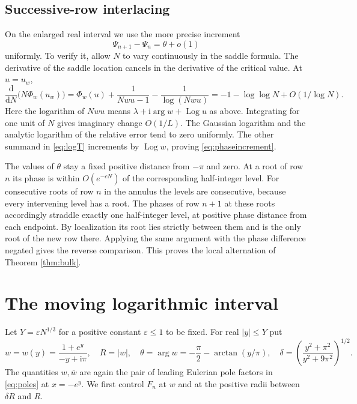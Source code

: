 \documentclass[11pt]{article}
\DeclareMathOperator{\Arg}{arg}
\newcommand{\dd}{\mathrm d}
\newcommand{\ii}{\mathrm i}
\newcommand{\Log}{\operatorname{Log}}
\begin{document}
\subsection{Successive-row interlacing}

On the enlarged real interval we use the more precise increment
\begin{equation}\label{eq:phaseincrement}
 \Psi_{n+1}-\Psi_n=\theta+o(1)
\end{equation}
uniformly. To verify it, allow \(N\) to vary continuously in the saddle formula. The derivative of the saddle location cancels in the derivative of the critical value. At \(u=u_w\),
\[
 \frac{\dd}{\dd N}\bigl(N\Phi_w(u_w)\bigr)
 =\Phi_w(u)+\frac{1}{Nwu-1}-\frac{1}{\log(Nwu)}
 =-1-\log\log N+O(1/\log N).
\]
Here the logarithm of \(Nwu\) means \(\lambda+\ii\Arg w+\Log u\) as above. Integrating for one unit of \(N\) gives imaginary change \(O(1/L)\). The Gaussian logarithm and the analytic logarithm of the relative error tend to zero uniformly. The other summand in \eqref{eq:logT} increments by \(\Log w\), proving \eqref{eq:phaseincrement}.

The values of \(\theta\) stay a fixed positive distance from \(-\pi\) and zero. At a root of row \(n\) its phase is within \(O(e^{-cN})\) of the corresponding half-integer level. For consecutive roots of row \(n\) in the annulus the levels are consecutive, because every intervening level has a root. The phases of row \(n+1\) at these roots accordingly straddle exactly one half-integer level, at positive phase distance from each endpoint. By localization its root lies strictly between them and is the only root of the new row there. Applying the same argument with the phase difference negated gives the reverse comparison. This proves the local alternation of Theorem \ref{thm:bulk}.

\section{The moving logarithmic interval}\label{sec:moving}

Let \(Y=\varepsilon N^{1/3}\) for a positive constant \(\varepsilon\le1\) to be fixed. For real \(|y|\le Y\) put
\begin{equation}\label{eq:movingparams}
 w=w(y)=\frac{1+e^y}{-y+\ii\pi},\quad
 R=|w|,\quad \theta=\Arg w=-\frac\pi2-\arctan(y/\pi),\quad
 \delta=\left(\frac{y^2+\pi^2}{y^2+9\pi^2}\right)^{1/2}.
\end{equation}
The quantities \(w,\overline w\) are again the pair of leading Eulerian pole factors in \eqref{eq:poles} at \(x=-e^y\). We first control \(F_n\) at \(w\) and at the positive radii between \(\delta R\) and \(R\).
\end{document}
